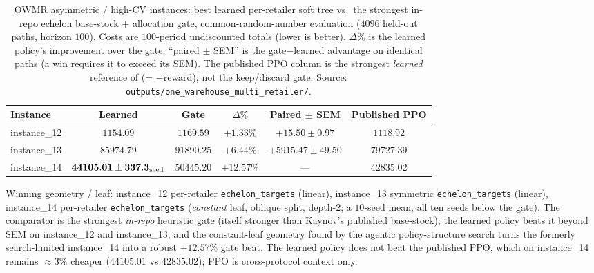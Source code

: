 \begin{table}[!htbp]
\centering
\small
\caption{OWMR asymmetric / high-CV instances: best learned per-retailer soft tree vs.\ the strongest
in-repo echelon base-stock $+$ allocation gate, common-random-number evaluation ($4096$ held-out
paths, horizon $100$). Costs are $100$-period undiscounted totals (lower is better). $\Delta\%$ is the
learned policy's improvement over the gate; ``paired $\pm$ SEM'' is the gate$-$learned advantage on
identical paths (a win requires it to exceed its SEM). The published PPO column is the strongest
\emph{learned} reference of \citet{kaynov2024owmr} (= $-$reward), not the keep/discard gate. Source:
\texttt{outputs/one\_warehouse\_multi\_retailer/}.}
\label{tab:owmr-results}
\begin{tabular}{lccccc}
\toprule
Instance & Learned & Gate & $\Delta\%$ & Paired $\pm$ SEM & Published PPO \\
\midrule
instance\_12 & $\mathbf{1154.09}$  & $1169.59$  & $\mathbf{+1.33\%}$ & $+15.50\pm0.97$    & $1118.92$ \\
instance\_13 & $\mathbf{85974.79}$ & $91890.25$ & $\mathbf{+6.44\%}$ & $+5915.47\pm49.50$ & $79727.39$ \\
instance\_14 & $\mathbf{44105.01\pm337.3_{\rm seed}}$ & $50445.20$ & $\mathbf{+12.57\%}$ & --- & $42835.02$ \\
\bottomrule
\end{tabular}
\par\medskip\footnotesize Winning geometry / leaf: instance\_12 per-retailer \texttt{echelon\_targets}
(linear), instance\_13 symmetric \texttt{echelon\_targets} (linear), instance\_14 per-retailer
\texttt{echelon\_targets} (\emph{constant} leaf, oblique split, depth-2; a $10$-seed mean,
all ten seeds below the gate). The comparator is the
strongest \emph{in-repo} heuristic gate (itself stronger than Kaynov's published base-stock); the
learned policy beats it beyond SEM on instance\_12 and instance\_13, and the constant-leaf geometry
found by the agentic policy-structure search turns the formerly search-limited
instance\_14 into a robust $+12.57\%$ gate beat. The learned policy does not beat the published PPO,
which on instance\_14 remains $\approx 3\%$ cheaper ($44105.01$ vs $42835.02$); PPO is cross-protocol
context only.
\end{table}
\FloatBarrier
